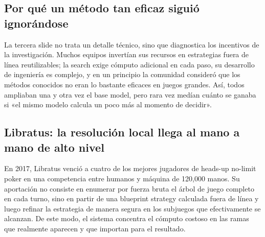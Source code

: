 \subsection{Por qué un método tan eficaz siguió ignorándose}

La tercera slide no trata un detalle técnico, sino que diagnostica los incentivos de la investigación. Muchos equipos invertían sus recursos en estrategias fuera de línea reutilizables; la search exige cómputo adicional en cada paso, su desarrollo de ingeniería es complejo, y en un principio la comunidad consideró que los métodos conocidos no eran lo bastante eficaces en juegos grandes. Así, todos ampliaban una y otra vez el base model, pero rara vez medían cuánto se ganaba si «el mismo modelo calcula un poco más al momento de decidir».



\subsection{Libratus: la resolución local llega al mano a mano de alto nivel}

En 2017, Libratus venció a cuatro de los mejores jugadores de heads-up no-limit poker en una competencia entre humanos y máquina de 120,000 manos. Su aportación no consiste en enumerar por fuerza bruta el árbol de juego completo en cada turno, sino en partir de una blueprint strategy calculada fuera de línea y luego refinar la estrategia de manera segura en los subjuegos que efectivamente se alcanzan. De este modo, el sistema concentra el cómputo costoso en las ramas que realmente aparecen y que importan para el resultado.


